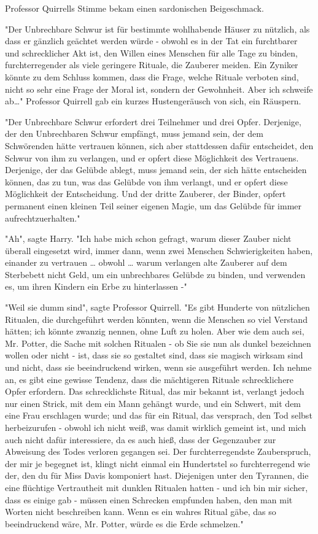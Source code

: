 {Professor Quirrells Stimme bekam einen sardonischen Beigeschmack.

"Der Unbrechbare Schwur ist für bestimmte wohlhabende Häuser zu nützlich, als dass er gänzlich geächtet werden würde - obwohl es in der Tat ein furchtbarer und schrecklicher Akt ist, den Willen eines Menschen für alle Tage zu binden, furchterregender als viele geringere Rituale, die Zauberer meiden. Ein Zyniker könnte zu dem Schluss kommen, dass die Frage, welche Rituale verboten sind, nicht so sehr eine Frage der Moral ist, sondern der Gewohnheit. Aber ich schweife ab…" Professor Quirrell gab ein kurzes Hustengeräusch von sich, ein Räuspern.

"Der Unbrechbare Schwur erfordert drei Teilnehmer und drei Opfer. Derjenige, der den Unbrechbaren Schwur empfängt, muss jemand sein, der dem Schwörenden hätte vertrauen können, sich aber stattdessen dafür entscheidet, den Schwur von ihm zu verlangen, und er opfert diese Möglichkeit des Vertrauens. Derjenige, der das Gelübde ablegt, muss jemand sein, der sich hätte entscheiden können, das zu tun, was das Gelübde von ihm verlangt, und er opfert diese Möglichkeit der Entscheidung. Und der dritte Zauberer, der Binder, opfert permanent einen kleinen Teil seiner eigenen Magie, um das Gelübde für immer aufrechtzuerhalten."

"Ah", sagte Harry. "Ich habe mich schon gefragt, warum dieser Zauber nicht überall eingesetzt wird, immer dann, wenn zwei Menschen Schwierigkeiten haben, einander zu vertrauen … obwohl … warum verlangen alte Zauberer auf dem Sterbebett nicht Geld, um ein unbrechbares Gelübde zu binden, und verwenden es, um ihren Kindern ein Erbe zu hinterlassen -"

"Weil sie dumm sind", sagte Professor Quirrell. "Es gibt Hunderte von nützlichen Ritualen, die durchgeführt werden könnten, wenn die Menschen so viel Verstand hätten; ich könnte zwanzig nennen, ohne Luft zu holen. Aber wie dem auch sei, Mr. Potter, die Sache mit solchen Ritualen - ob Sie sie nun als dunkel bezeichnen wollen oder nicht - ist, dass sie so gestaltet sind, dass sie magisch wirksam sind und nicht, dass sie beeindruckend wirken, wenn sie ausgeführt werden. Ich nehme an, es gibt eine gewisse Tendenz, dass die mächtigeren Rituale schrecklichere Opfer erfordern. Das schrecklichste Ritual, das mir bekannt ist, verlangt jedoch nur einen Strick, mit dem ein Mann gehängt wurde, und ein Schwert, mit dem eine Frau erschlagen wurde; und das für ein Ritual, das versprach, den Tod selbst herbeizurufen - obwohl ich nicht weiß, was damit wirklich gemeint ist, und mich auch nicht dafür interessiere, da es auch hieß, dass der Gegenzauber zur Abweisung des Todes verloren gegangen sei. Der furchterregendste Zauberspruch, der mir je begegnet ist, klingt nicht einmal ein Hundertstel so furchterregend wie der, den du für Miss Davis komponiert hast. Diejenigen unter den Tyrannen, die eine flüchtige Vertrautheit mit dunklen Ritualen hatten - und ich bin mir sicher, dass es einige gab - müssen einen Schrecken empfunden haben, den man mit Worten nicht beschreiben kann. Wenn es ein wahres Ritual gäbe, das so beeindruckend wäre, Mr. Potter, würde es die Erde schmelzen."

}
